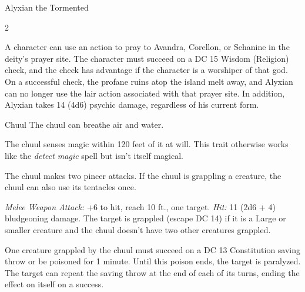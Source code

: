 \documentclass[10pt,a4paper,twoside,fancy,bg=print,twocolumn,openany,nodeprecatedcode]{dndbook}
\begin{document}
\begin{DndMonster}[float*=b,width=\textwidth + 8pt]{Alyxian the Tormented}
\begin{multicols}{2}
\begin{description}
\end{description}

A character can use an action to pray to Avandra, Corellon, or Sehanine in the deity's prayer site. The character must succeed on a DC 15 Wisdom (Religion) check, and the check has advantage if the character is a worshiper of that god. On a successful check, the profane ruins atop the island melt away, and Alyxian can no longer use the lair action associated with that prayer site. In addition, Alyxian takes 14 (4d6) psychic damage, regardless of his current form.

\end{multicols}
\end{DndMonster}


\begin{DndMonster}[float=t]{Chuul}
\DndMonsterBasics[
armor-class = {16 (natural armor)},
hit-points = {\DndDice{11d10 + 33}},
speed = {30 ft., swim 30 ft.}
]
\DndMonsterAbilityScores[
 str = 19,
 dex = 10,
 con = 16,
 int = 5,
 wis = 11,
 cha = 5
]
\DndMonsterDetails[
skills = {Perception +4},
damage-immunities = {poison},
senses = {darkvision 60 ft., passive perception 14},
languages = {understands Deep Speech but can't speak},
challenge = 4,
]
The chuul can breathe air and water.

The chuul senses magic within 120 feet of it at will. This trait otherwise works like the \textit{detect magic} spell but isn't itself magical.

The chuul makes two pincer attacks. If the chuul is grappling a creature, the chuul can also use its tentacles once.

\textsl{Melee Weapon Attack:} +6 to hit, reach 10 ft., one target. \textsl{Hit:} 11 (2d6 + 4) bludgeoning damage. The target is grappled (escape DC 14) if it is a Large or smaller creature and the chuul doesn't have two other creatures grappled.

One creature grappled by the chuul must succeed on a DC 13 Constitution saving throw or be poisoned for 1 minute. Until this poison ends, the target is paralyzed. The target can repeat the saving throw at the end of each of its turns, ending the effect on itself on a success.

\end{DndMonster}
\end{document}
